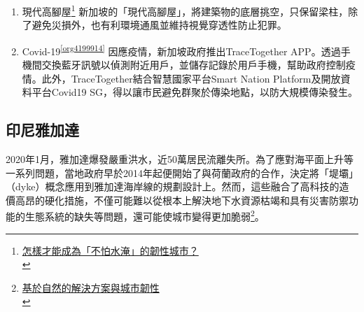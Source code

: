 \documentclass[a4paper,12pt]{article}
\begin{document}
\begin{enumerate}
\item 現代高腳屋\footnote{\href{https://kungsdailylife.blogspot.com/2019/05/blog-post\_34.html}{怎樣才能成為「不怕水淹」的韌性城市？ }\\}
\label{sec:org340243a}
新加坡的「現代高腳屋」，將建築物的底層挑空，只保留梁柱，除了避免災損外，也有利環境通風並維持視覺穿透性防止犯罪。\\

\item Covid-19\textsuperscript{\ref{org4199914}}
\label{sec:org6c77e55}
因應疫情，新加坡政府推出TraceTogether APP。透過手機間交換藍牙訊號以偵測附近用戶，並儲存記錄於用戶手機，幫助政府控制疫情。此外，TraceTogether結合智慧國家平台Smart Nation Platform及開放資料平台Covid19 SG，得以讓市民避免群聚於傳染地點，以防大規模傳染發生。\\
\end{enumerate}

\subsection{印尼雅加達}
\label{sec:org6f6ae5a}
2020年1月，雅加達爆發嚴重洪水，近50萬居民流離失所。為了應對海平面上升等一系列問題，當地政府早於2014年起便開始了與荷蘭政府的合作，決定將「堤壩」（dyke）概念應用到雅加達海岸線的規劃設計上。然而，這些融合了高科技的造價高昂的硬化措施，不僅可能難以從根本上解決地下水資源枯竭和具有災害防禦功能的生態系統的缺失等問題，還可能使城市變得更加脆弱\footnote{\href{https://twgreatdaily.com/OR8rtHMBLq-Ct6CZ8wQ5.html}{基於自然的解決方案與城市韌性}\\\label{org036abdf}}。\\
\end{document}
